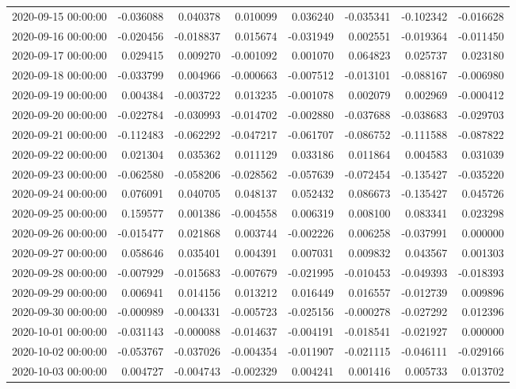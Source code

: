 \begin{tabular}{lrrrrrrr}
2020-09-15 00:00:00 & -0.036088 & 0.040378 & 0.010099 & 0.036240 & -0.035341 & -0.102342 & -0.016628 \\
2020-09-16 00:00:00 & -0.020456 & -0.018837 & 0.015674 & -0.031949 & 0.002551 & -0.019364 & -0.011450 \\
2020-09-17 00:00:00 & 0.029415 & 0.009270 & -0.001092 & 0.001070 & 0.064823 & 0.025737 & 0.023180 \\
2020-09-18 00:00:00 & -0.033799 & 0.004966 & -0.000663 & -0.007512 & -0.013101 & -0.088167 & -0.006980 \\
2020-09-19 00:00:00 & 0.004384 & -0.003722 & 0.013235 & -0.001078 & 0.002079 & 0.002969 & -0.000412 \\
2020-09-20 00:00:00 & -0.022784 & -0.030993 & -0.014702 & -0.002880 & -0.037688 & -0.038683 & -0.029703 \\
2020-09-21 00:00:00 & -0.112483 & -0.062292 & -0.047217 & -0.061707 & -0.086752 & -0.111588 & -0.087822 \\
2020-09-22 00:00:00 & 0.021304 & 0.035362 & 0.011129 & 0.033186 & 0.011864 & 0.004583 & 0.031039 \\
2020-09-23 00:00:00 & -0.062580 & -0.058206 & -0.028562 & -0.057639 & -0.072454 & -0.135427 & -0.035220 \\
2020-09-24 00:00:00 & 0.076091 & 0.040705 & 0.048137 & 0.052432 & 0.086673 & -0.135427 & 0.045726 \\
2020-09-25 00:00:00 & 0.159577 & 0.001386 & -0.004558 & 0.006319 & 0.008100 & 0.083341 & 0.023298 \\
2020-09-26 00:00:00 & -0.015477 & 0.021868 & 0.003744 & -0.002226 & 0.006258 & -0.037991 & 0.000000 \\
2020-09-27 00:00:00 & 0.058646 & 0.035401 & 0.004391 & 0.007031 & 0.009832 & 0.043567 & 0.001303 \\
2020-09-28 00:00:00 & -0.007929 & -0.015683 & -0.007679 & -0.021995 & -0.010453 & -0.049393 & -0.018393 \\
2020-09-29 00:00:00 & 0.006941 & 0.014156 & 0.013212 & 0.016449 & 0.016557 & -0.012739 & 0.009896 \\
2020-09-30 00:00:00 & -0.000989 & -0.004331 & -0.005723 & -0.025156 & -0.000278 & -0.027292 & 0.012396 \\
2020-10-01 00:00:00 & -0.031143 & -0.000088 & -0.014637 & -0.004191 & -0.018541 & -0.021927 & 0.000000 \\
2020-10-02 00:00:00 & -0.053767 & -0.037026 & -0.004354 & -0.011907 & -0.021115 & -0.046111 & -0.029166 \\
2020-10-03 00:00:00 & 0.004727 & -0.004743 & -0.002329 & 0.004241 & 0.001416 & 0.005733 & 0.013702 \\

\end{tabular}
